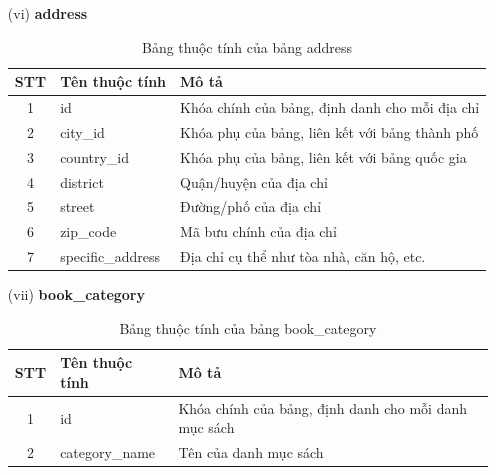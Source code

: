 \documentclass[../DoAn.tex]{subfiles}
\begin{document}
\begin{enumerate}
    \item[(vi)] \textbf{address}
    \begin{table}[H]
    \centering
        \begin{tabular}{|c|m{4cm}|m{8cm}|}
        \hline
        \textbf{STT} & \textbf{Tên thuộc tính} & \textbf{Mô tả} \\
        \hline
        1 & id & Khóa chính của bảng, định danh cho mỗi địa chỉ \\
        \hline
        2 & city\_id & Khóa phụ của bảng, liên kết với bảng thành phố \\
        \hline
        3 & country\_id & Khóa phụ của bảng, liên kết với bảng quốc gia \\
        \hline
        4 & district & Quận/huyện của địa chỉ \\
        \hline
        5 & street & Đường/phố của địa chỉ \\
        \hline
        6 & zip\_code & Mã bưu chính của địa chỉ \\
        \hline
        7 & specific\_address & Địa chỉ cụ thể như tòa nhà, căn hộ, etc. \\
        \hline
        \end{tabular}
        \caption{Bảng thuộc tính của bảng address}
        \label{tab:address_attributes}
    \end{table}

    \item[(vii)] \textbf{book\_category}
    \begin{table}[H]
        \centering
        \begin{tabular}{|c|m{4cm}|m{8cm}|}
        \hline
        \textbf{STT} & \textbf{Tên thuộc tính} & \textbf{Mô tả} \\
        \hline
        1 & id & Khóa chính của bảng, định danh cho mỗi danh mục sách \\
        \hline
        2 & category\_name & Tên của danh mục sách \\
        \hline
        \end{tabular}
        \caption{Bảng thuộc tính của bảng book\_category}
        \label{tab:book_category_attributes}
    \end{table}


\end{enumerate}
\end{document}
